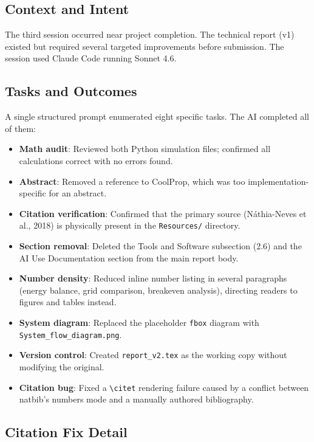 \documentclass[12pt, letterpaper]{article}
\begin{document}
\subsection{Context and Intent}

The third session occurred near project completion. The technical report (v1) existed but required several targeted improvements before submission. The session used Claude Code running Sonnet 4.6.

\subsection{Tasks and Outcomes}

A single structured prompt enumerated eight specific tasks. The AI completed all of them:

\begin{itemize}[noitemsep]
    \item \textbf{Math audit}: Reviewed both Python simulation files; confirmed all calculations correct with no errors found.
    \item \textbf{Abstract}: Removed a reference to CoolProp, which was too implementation-specific for an abstract.
    \item \textbf{Citation verification}: Confirmed that the primary source (N\'{a}thia-Neves et al., 2018) is physically present in the \texttt{Resources/} directory.
    \item \textbf{Section removal}: Deleted the Tools and Software subsection (2.6) and the AI Use Documentation section from the main report body.
    \item \textbf{Number density}: Reduced inline number listing in several paragraphs (energy balance, grid comparison, breakeven analysis), directing readers to figures and tables instead.
    \item \textbf{System diagram}: Replaced the placeholder \texttt{fbox} diagram with \texttt{System\_flow\_diagram.png}.
    \item \textbf{Version control}: Created \texttt{report\_v2.tex} as the working copy without modifying the original.
    \item \textbf{Citation bug}: Fixed a \texttt{{\textbackslash}citet} rendering failure caused by a conflict between natbib's numbers mode and a manually authored bibliography.
\end{itemize}

\subsection{Citation Fix Detail}
\end{document}

